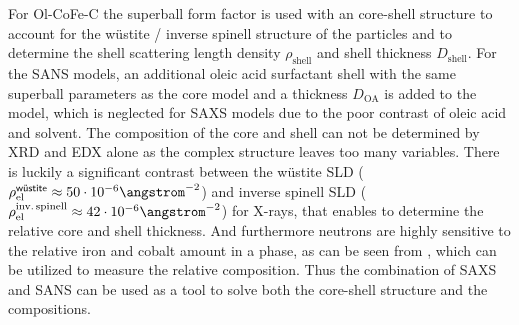 \documentclass[\main/dresen_thesis.tex]{subfiles}
\begin{document}
    For Ol-CoFe-C the superball form factor is used with an core-shell structure to account for the w\"ustite / inverse spinell structure of the particles and to determine the shell scattering length density $\rho_\mathrm{shell}$ and shell thickness $D_\mathrm{shell}$.
    For the SANS models, an additional oleic acid surfactant shell with the same superball parameters as the core model and a thickness $D_\mathrm{OA}$ is added to the model, which is neglected for SAXS models due to the poor contrast of oleic acid and solvent.
    The composition of the core and shell can not be determined by XRD and EDX alone as the complex structure leaves too many variables.
    There is luckily a significant contrast between the w\"ustite SLD ($\rho_\mathrm{el}^\textsf{w\"ustite} \approx 50 \cdot 10^{-6} \angstrom^{-2}$) and inverse spinell SLD ($\rho_\mathrm{el}^\mathrm{inv.\, spinell} \approx 42 \cdot 10^{-6} \angstrom^{-2}$) for X-rays, that enables to determine the relative core and shell thickness.
    And furthermore neutrons are highly sensitive to the relative iron and cobalt amount in a phase, as can be seen from , which can be utilized to measure the relative composition.
    Thus the combination of SAXS and SANS can be used as a tool to solve both the core-shell structure and the compositions.
\end{document}
